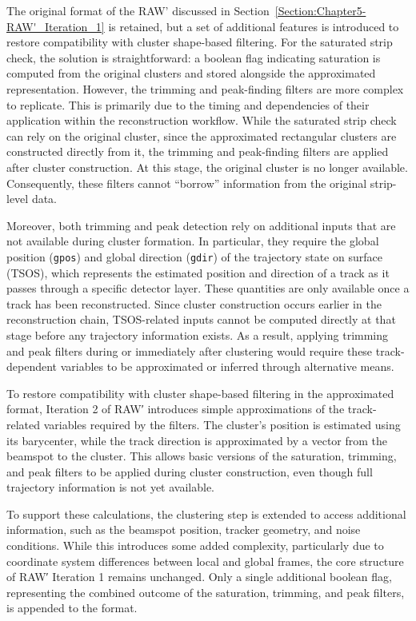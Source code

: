 The original format of the RAW' discussed in Section~\ref{Section:Chapter5-RAW'_Iteration_1} is retained, but a set of additional features is introduced to restore compatibility with cluster shape-based filtering. For the saturated strip check, the solution is straightforward: a boolean flag indicating saturation is computed from the original clusters and stored alongside the approximated representation. However, the trimming and peak-finding filters are more complex to replicate. This is primarily due to the timing and dependencies of their application within the reconstruction workflow. While the saturated strip check can rely on the original cluster, since the approximated rectangular clusters are constructed directly from it, the trimming and peak-finding filters are applied after cluster construction. At this stage, the original cluster is no longer available. Consequently, these filters cannot ``borrow'' information from the original strip-level data.

Moreover, both trimming and peak detection rely on additional inputs that are not available during cluster formation. In particular, they require the global position (\texttt{gpos}) and global direction (\texttt{gdir}) of the trajectory state on surface (TSOS), which represents the estimated position and direction of a track as it passes through a specific detector layer. These quantities are only available once a track has been reconstructed. Since cluster construction occurs earlier in the reconstruction chain, TSOS-related inputs cannot be computed directly at that stage before any trajectory information exists. As a result, applying trimming and peak filters during or immediately after clustering would require these track-dependent variables to be approximated or inferred through alternative means.

To restore compatibility with cluster shape-based filtering in the approximated format, Iteration 2 of RAW′ introduces simple approximations of the track-related variables required by the filters. The cluster's position is estimated using its barycenter, while the track direction is approximated by a vector from the beamspot to the cluster. This allows basic versions of the saturation, trimming, and peak filters to be applied during cluster construction, even though full trajectory information is not yet available.

To support these calculations, the clustering step is extended to access additional information, such as the beamspot position, tracker geometry, and noise conditions. While this introduces some added complexity, particularly due to coordinate system differences between local and global frames, the core structure of RAW′ Iteration 1 remains unchanged. Only a single additional boolean flag, representing the combined outcome of the saturation, trimming, and peak filters, is appended to the format.

